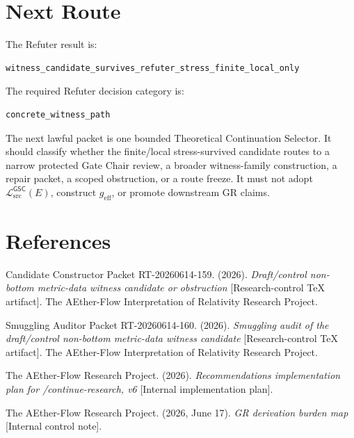 \documentclass[11pt]{article}
\newcommand{\MetricData}{\mathcal{L}_{\mathrm{src}}^{\mathsf{GSC}}}
\newcommand{\geff}{g_{\mathrm{eff}}}
\begin{document}
\section{Next Route}

The Refuter result is:

\begin{verbatim}
witness_candidate_survives_refuter_stress_finite_local_only
\end{verbatim}

The required Refuter decision category is:

\begin{verbatim}
concrete_witness_path
\end{verbatim}

The next lawful packet is one bounded Theoretical Continuation Selector. It
should classify whether the finite/local stress-survived candidate routes to
a narrow protected Gate Chair review, a broader witness-family construction,
a repair packet, a scoped obstruction, or a route freeze. It must not adopt
\(\MetricData(E)\), construct \(\geff\), or promote downstream GR claims.

\section*{References}

Candidate Constructor Packet RT-20260614-159. (2026). \textit{Draft/control
non-bottom metric-data witness candidate or obstruction} [Research-control
TeX artifact]. The AEther-Flow Interpretation of Relativity Research Project.

Smuggling Auditor Packet RT-20260614-160. (2026). \textit{Smuggling audit of
the draft/control non-bottom metric-data witness candidate} [Research-control
TeX artifact]. The AEther-Flow Interpretation of Relativity Research Project.

The AEther-Flow Research Project. (2026). \textit{Recommendations
implementation plan for /continue-research, v6} [Internal implementation
plan].

The AEther-Flow Research Project. (2026, June 17). \textit{GR derivation
burden map} [Internal control note].
\end{document}
